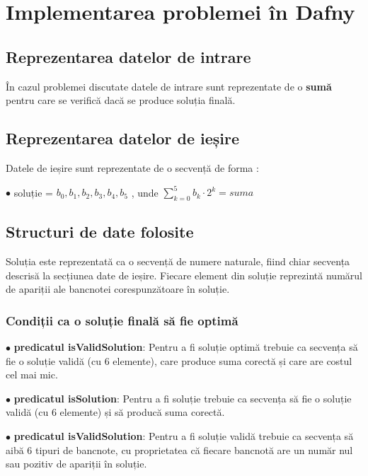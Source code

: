 \chapter{Implementarea problemei în Dafny}


\section{ Reprezentarea datelor de intrare }
În cazul problemei discutate datele de intrare sunt reprezentate de o \textbf{sumă} 
pentru care se verifică dacă se produce soluția finală.

\section{ Reprezentarea datelor de ieșire}
Datele de ieșire sunt reprezentate de o secvență de forma : \par
$\bullet$ soluție  = { $b_{0}, b_{1}, b_{2}, b_{3}, b_{4}, b_{5}$} , unde $\sum_{k=0}^{5} b_{k} \cdot 2^{k} = suma $

\section{ Structuri de date folosite}
Soluția este reprezentată ca o secvență de numere naturale, fiind chiar secvența descrisă la secțiunea date de ieșire.
Fiecare element din soluție reprezintă numărul de apariții ale bancnotei corespunzătoare în soluție. 

\subsection{Condiții ca o soluție finală să fie optimă}
$\bullet$ \textbf{predicatul isValidSolution}: Pentru a fi soluție optimă trebuie ca secvența să fie o soluție validă (cu 6 elemente), 
care produce suma corectă și care are costul cel mai mic.\par
$\bullet$ \textbf{predicatul isSolution}: Pentru a fi soluție trebuie ca secvența să fie o soluție validă (cu 6 elemente) și
să producă suma corectă.\par
$\bullet$ \textbf{predicatul isValidSolution}: Pentru a fi soluție validă trebuie ca secvența să aibă 6 tipuri de bancnote, cu 
proprietatea că fiecare bancnotă are un număr nul sau pozitiv de apariții în soluție.\par
    